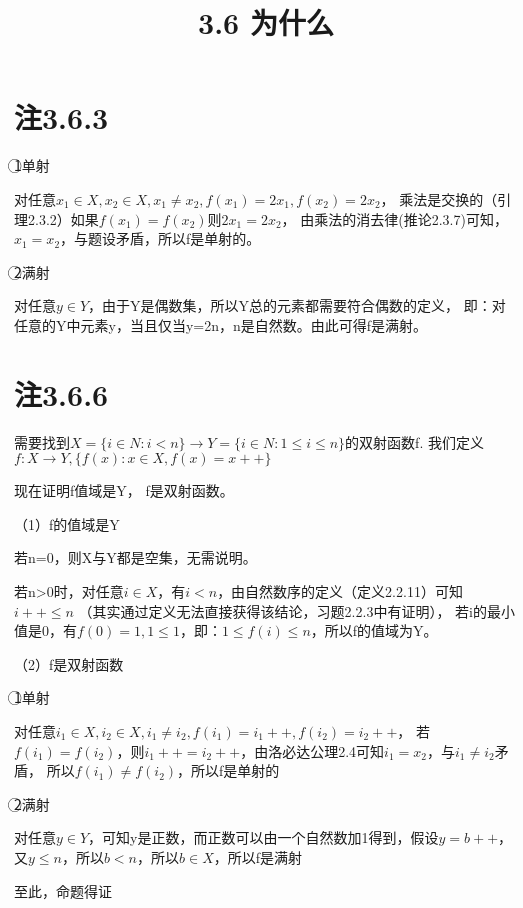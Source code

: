 \documentclass{article}
\theoremstyle{mystyle}
\theoremstyle{zproofstyle}
\begin{document}
\title{3.6 为什么}
\maketitle

\section*{注3.6.3}
\textcircled{1}单射

对任意$x_1 \in X, x_2 \in X, x_1 \neq x_2, f(x_1)=2x_1,f(x_2)=2x_2$，
乘法是交换的（引理2.3.2）如果$f(x_1)=f(x_2)$则$2x_1=2x_2$，
由乘法的消去律(推论2.3.7)可知，$x_1=x_2$，与题设矛盾，所以f是单射的。

\textcircled{2}满射

对任意$y \in Y$，由于Y是偶数集，所以Y总的元素都需要符合偶数的定义，
即：对任意的Y中元素y，当且仅当y=2n，n是自然数。由此可得f是满射。

\section*{注3.6.6}
需要找到$X=\{i \in N: i<n\} \rightarrow Y=\{i \in N: 1\leq i \leq n \}$的双射函数f.
我们定义$f: X \rightarrow Y, \{f(x): x \in X, f(x) = x ++\}$

现在证明f值域是Y， f是双射函数。

（1）f的值域是Y

若n=0，则X与Y都是空集，无需说明。

若n>0时，对任意$i \in X$，有$i < n$，由自然数序的定义（定义2.2.11）可知$i++ \leq n$
（其实通过定义无法直接获得该结论，习题2.2.3中有证明），
若i的最小值是0，有$f(0) = 1,1 \leq 1$，即：$1 \leq f(i) \leq n$，所以f的值域为Y。

（2）f是双射函数

\textcircled{1}单射

对任意$i_1 \in X, i_2 \in X, i_1 \neq i_2, f(i_1) = i_1++, f(i_2) = i_2++$，
若$f(i_1) = f(i_2)$，则$i_1++ = i_2++$，由洛必达公理2.4可知$i_1 = x_2$，与$i_1 \neq i_2$矛盾，
所以$f(i_1) \neq f(i_2)$，所以f是单射的

\textcircled{2}满射

对任意$y \in Y$，可知y是正数，而正数可以由一个自然数加1得到，假设$y = b++$，
又$y \leq n$，所以$b < n$，所以$b \in X$，所以f是满射

至此，命题得证
\end{document}
